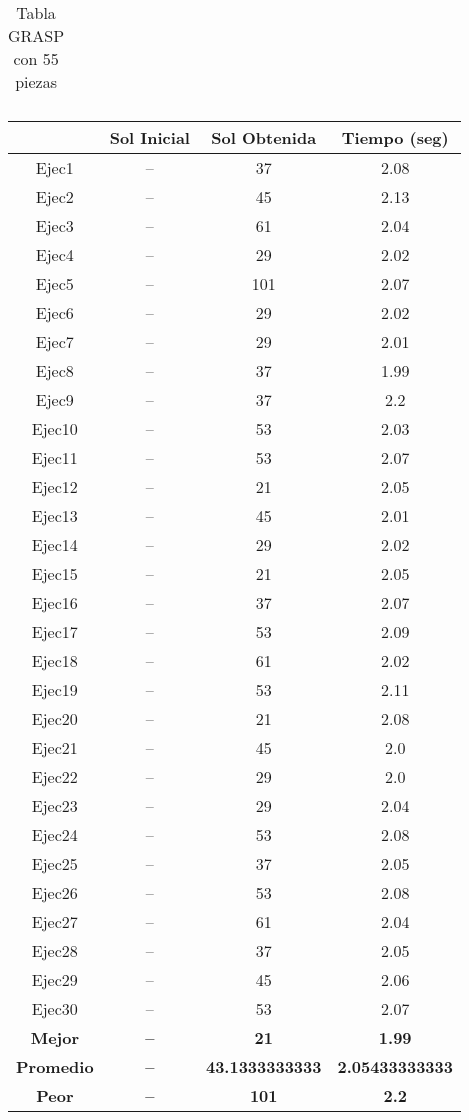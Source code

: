 \begin{center}
\begin{table}
\begin{tabular}{|c|c|c|c|}
\end{tabular}
\caption{Tabla GRASP con 55 piezas}
\end{table}

\begin{table}

\begin{tabular}{|c|c|c|c|}



\hline
 & {\bf Sol Inicial} & {\bf Sol Obtenida} & {\bf Tiempo (seg)} \\
\hline
Ejec1 & -- & 37  & 2.08 \\
\hline
Ejec2 & -- & 45  & 2.13 \\
\hline
Ejec3 & -- & 61  & 2.04 \\
\hline
Ejec4 & -- & 29  & 2.02 \\
\hline
Ejec5 & -- & 101  & 2.07 \\
\hline
Ejec6 & -- & 29  & 2.02 \\
\hline
Ejec7 & -- & 29  & 2.01 \\
\hline
Ejec8 & -- & 37  & 1.99 \\
\hline
Ejec9 & -- & 37  & 2.2 \\
\hline
Ejec10 & -- & 53  & 2.03 \\
\hline
Ejec11 & -- & 53  & 2.07 \\
\hline
Ejec12 & -- & 21  & 2.05 \\
\hline
Ejec13 & -- & 45  & 2.01 \\
\hline
Ejec14 & -- & 29  & 2.02 \\
\hline
Ejec15 & -- & 21  & 2.05 \\
\hline
Ejec16 & -- & 37  & 2.07 \\
\hline
Ejec17 & -- & 53  & 2.09 \\
\hline
Ejec18 & -- & 61  & 2.02 \\
\hline
Ejec19 & -- & 53  & 2.11 \\
\hline
Ejec20 & -- & 21  & 2.08 \\
\hline
Ejec21 & -- & 45  & 2.0 \\
\hline
Ejec22 & -- & 29  & 2.0 \\
\hline
Ejec23 & -- & 29  & 2.04 \\
\hline
Ejec24 & -- & 53  & 2.08 \\
\hline
Ejec25 & -- & 37  & 2.05 \\
\hline
Ejec26 & -- & 53  & 2.08 \\
\hline
Ejec27 & -- & 61  & 2.04 \\
\hline
Ejec28 & -- & 37  & 2.05 \\
\hline
Ejec29 & -- & 45  & 2.06 \\
\hline
Ejec30 & -- & 53  & 2.07 \\
\hline
{\bf Mejor} & {\bf -- } & {\bf 21} & {\bf 1.99} \\
\hline
{\bf Promedio} & {\bf -- } & {\bf 43.1333333333} & {\bf 2.05433333333} \\
\hline
{\bf Peor} & {\bf -- } & {\bf 101} & {\bf 2.2} \\
\hline


\end{tabular}
\end{table}
\end{center}
